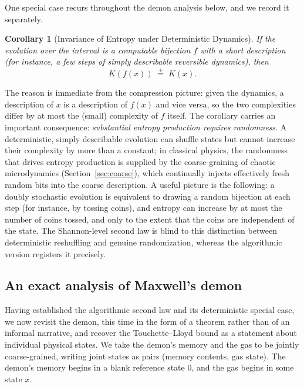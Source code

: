 \documentclass[10pt]{article}
\newtheorem{corollary}[theorem]{Corollary}
\theoremstyle{definition}
\theoremstyle{remark}
\newcommand{\peq}{\mathrel{\stackrel{+}{=}}}
\begin{document}
One special case recurs throughout the demon analysis below, and we record it separately.

\begin{corollary}[Invariance of Entropy under Deterministic Dynamics]
\label{cor:deterministic}
If the evolution over the interval is a computable bijection $f$ with a short description (for instance, a few steps of simply describable reversible dynamics), then
\[
K(f(x)) \;\peq\; K(x).
\]
\end{corollary}

The reason is immediate from the compression picture: given the dynamics, a description of $x$ is a description of $f(x)$ and vice versa, so the two complexities differ by at most the (small) complexity of $f$ itself. The corollary carries an important consequence: \emph{substantial entropy production requires randomness}. A deterministic, simply describable evolution can shuffle states but cannot increase their complexity by more than a constant; in classical physics, the randomness that drives entropy production is supplied by the coarse-graining of chaotic microdynamics (Section~\ref{sec:coarse}), which continually injects effectively fresh random bits into the coarse description. A useful picture is the following: a doubly stochastic evolution is equivalent to drawing a random bijection at each step (for instance, by tossing coins), and entropy can increase by at most the number of coins tossed, and only to the extent that the coins are independent of the state. The Shannon-level second law is blind to this distinction between deterministic reshuffling and genuine randomization, whereas the algorithmic version registers it precisely.

\subsection{An exact analysis of Maxwell's demon}
\label{sec:demon}

Having established the algorithmic second law and its deterministic special case, we now revisit the demon, this time in the form of a theorem rather than of an informal narrative, and recover the Touchette--Lloyd bound as a statement about individual physical states. We take the demon's memory and the gas to be jointly coarse-grained, writing joint states as pairs (memory contents, gas state). The demon's memory begins in a blank reference state $0$, and the gas begins in some state $x$.
\end{document}
